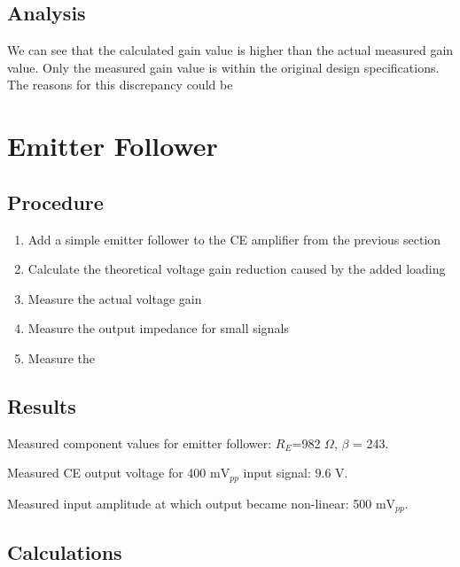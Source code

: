 \documentclass[12pt,letterpaper]{report}
\begin{document}
\subsection*{Analysis}

We can see that the calculated gain value is higher than the actual measured gain value. Only the measured gain value is within the original design specifications. The reasons for this discrepancy could be 

\section*{Emitter Follower}
\subsection*{Procedure}

\begin{enumerate}
\item Add a simple emitter follower to the CE amplifier from the previous section
\item Calculate the theoretical voltage gain reduction caused by the added loading
\item Measure the actual voltage gain
\item Measure the output impedance for small signals
\item Measure the 
\end{enumerate}


\subsection*{Results}

Measured component values for emitter follower:
$R_{E}$=982 $\Omega$,
$\beta$ = 243.

Measured CE output voltage for 400 m$\text{V}_{pp}$ input signal: 9.6 V.

Measured input amplitude at which output became non-linear: 500 m$\text{V}_{pp}$.

\subsection*{Calculations}
\end{document}
